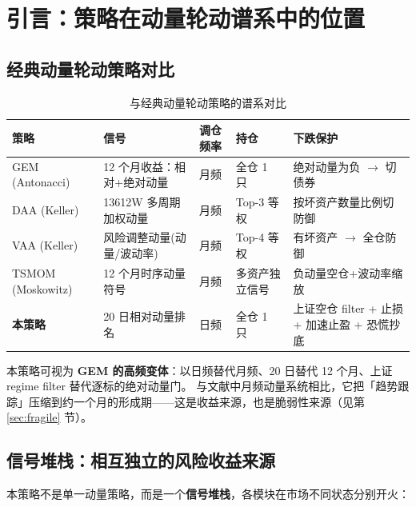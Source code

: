 \documentclass[11pt]{ctexart}
\begin{document}
\section{引言：策略在动量轮动谱系中的位置}

\subsection{经典动量轮动策略对比}

\begin{table}[htbp]
\centering
\caption{与经典动量轮动策略的谱系对比}
\begin{tabularx}{\textwidth}{p{3.4cm}XXp{2.2cm}X}
\toprule
策略 & 信号 & 调仓频率 & 持仓 & 下跌保护 \\
\midrule
GEM (Antonacci) & 12 个月收益：相对+绝对动量 & 月频 & 全仓 1 只 & 绝对动量为负 $\rightarrow$ 切债券 \\
DAA (Keller) & 13612W 多周期加权动量 & 月频 & Top-3 等权 & 按坏资产数量比例切防御 \\
VAA (Keller) & 风险调整动量(动量/波动率) & 月频 & Top-4 等权 & 有坏资产 $\rightarrow$ 全仓防御 \\
TSMOM (Moskowitz) & 12 个月时序动量符号 & 月频 & 多资产独立信号 & 负动量空仓+波动率缩放 \\
\addlinespace
\textbf{本策略} & 20 日相对动量排名 & 日频 & 全仓 1 只 & 上证空仓 filter + 止损 + 加速止盈 + 恐慌抄底 \\
\bottomrule
\end{tabularx}
\end{table}

本策略可视为 \textbf{GEM 的高频变体}：以日频替代月频、20 日替代 12 个月、上证 regime filter 替代逐标的绝对动量门。
与文献中月频动量系统相比，它把「趋势跟踪」压缩到约一个月的形成期——这是收益来源，也是脆弱性来源（见第 \ref{sec:fragile} 节）。

\subsection{信号堆栈：相互独立的风险收益来源}

本策略不是单一动量策略，而是一个\textbf{信号堆栈}，各模块在市场不同状态分别开火：
\end{document}
